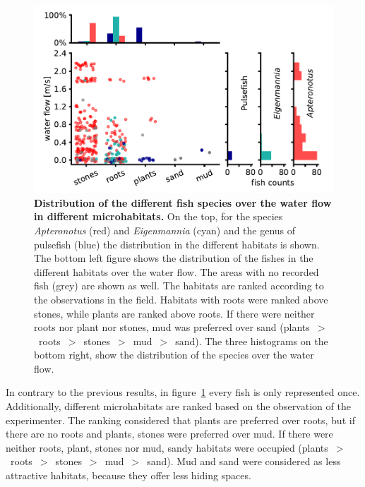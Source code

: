 \begin{figure}[H]
    \centering
    \includegraphics{pictures/Results/flow_habitat_protocol.pdf}
    \caption{\textbf{Distribution of the different fish species over the water flow in different microhabitats.} On the top, for the species \textit{Apteronotus} (red) and \textit{Eigenmannia} (cyan) and the genus of pulsefish (blue) the distribution in the different habitats is shown. The bottom left figure shows the distribution of the fishes in the different habitats over the water flow. The areas with no recorded fish (grey) are shown as well. The habitats are ranked according to the observations in the field. Habitats with roots were ranked above stones, while plants are ranked above roots. If there were neither roots nor plant nor stones, mud was preferred over sand (plants~$>$~roots~$>$~stones~$>$~mud~$>$~sand). The three histograms on the bottom right, show the distribution of the species over the water flow.}
    \label{fig:habitat_vs_flow}
\end{figure}

In contrary to the previous results, in figure~\ref{fig:habitat_vs_flow} every fish is only represented once. Additionally, different microhabitats are ranked based on the observation of the experimenter. The ranking considered that plants are preferred over roots, but if there are no roots and plants, stones were preferred over mud. If there were neither roots, plant, stones nor mud, sandy habitats were occupied (plants~$>$~roots~$>$~stones~$>$~mud~$>$~sand). Mud and sand were considered as less attractive habitats, because they offer less hiding spaces.\\

